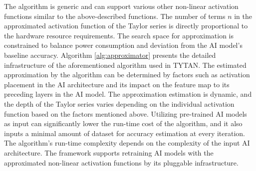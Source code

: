 \documentclass[runningheads]{llncs}
\begin{document}
    The algorithm is generic and can support various other non-linear activation functions similar to the above-described functions. The number of terms $n$ in the approximated activation function of the Taylor series is directly proportional to the hardware resource requirements. The search space for approximation is constrained to balance power consumption and deviation from the AI model’s baseline accuracy. Algorithm \ref{alg:approximator} presents the detailed infrastructure of the aforementioned algorithm used in TYTAN. The estimated approximation by the algorithm can be determined by factors such as activation placement in the AI architecture and its impact on the feature map to its preceding layers in the AI model. The approximation estimation is dynamic, and the depth of the Taylor series varies depending on the individual activation function based on the factors mentioned above. Utilizing pre-trained AI models as input can significantly lower the run-time cost of the algorithm, and it also inputs a minimal amount of dataset for accuracy estimation at every iteration. The algorithm's run-time complexity depends on the complexity of the input AI architecture. The framework supports retraining AI models with the approximated non-linear activation functions by its pluggable infrastructure.



\end{document}
